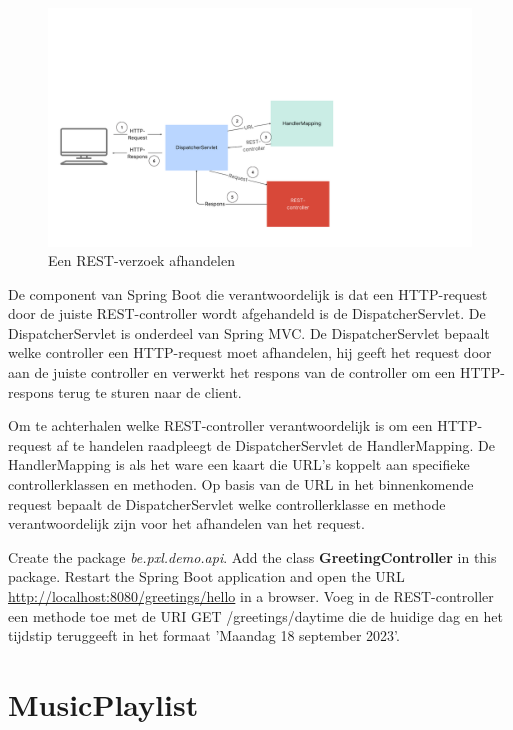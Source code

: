\begin{figure}[H]
  \includegraphics[width=\linewidth]{images/chapter-rest/dispatcherservlet.png}
  \caption{Een REST-verzoek afhandelen}
  \label{fig:test_passed}
\end{figure}

De component van Spring Boot die verantwoordelijk is dat een HTTP-request door de juiste REST-controller wordt afgehandeld is de DispatcherServlet.  De DispatcherServlet is onderdeel van Spring MVC.  De DispatcherServlet bepaalt welke controller een HTTP-request moet afhandelen,  hij geeft het request door aan de juiste controller en  verwerkt het respons van de controller om een HTTP-respons terug te sturen naar de client.

Om te achterhalen welke REST-controller verantwoordelijk is om een HTTP-request af te handelen raadpleegt de DispatcherServlet de HandlerMapping. De HandlerMapping is als het ware een kaart die URL's koppelt aan specifieke controllerklassen en methoden.
Op basis van de URL in het binnenkomende request bepaalt de DispatcherServlet welke controllerklasse en methode verantwoordelijk zijn voor het afhandelen van het request.


\begin{oefening}
Create the package \textit{be.pxl.demo.api}. Add the class \textbf{GreetingController} in this package. Restart the Spring Boot application and open the URL \url{http://localhost:8080/greetings/hello} in a browser. Voeg in de REST-controller een methode toe met de URI GET /greetings/daytime die de huidige dag en het tijdstip teruggeeft in het formaat 'Maandag 18 september 2023'.
\end{oefening}

\section{MusicPlaylist}

